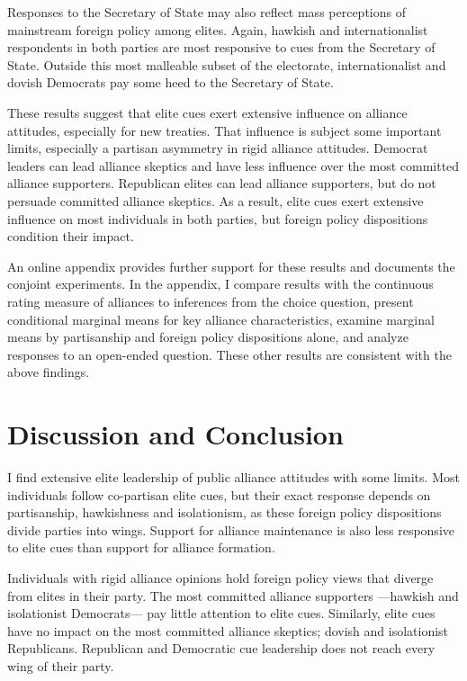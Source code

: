 \documentclass[12pt]{article}
\begin{document}
Responses to the Secretary of State may also reflect mass perceptions of mainstream foreign policy among elites.
Again, hawkish and internationalist respondents in both parties are most responsive to cues from the Secretary of State.
Outside this most malleable subset of the electorate, internationalist and dovish Democrats pay some heed to the Secretary of State.  


These results suggest that elite cues exert extensive influence on alliance attitudes, especially for new treaties.
That influence is subject some important limits, especially a partisan asymmetry in rigid alliance attitudes. 
Democrat leaders can lead alliance skeptics and have less influence over the most committed alliance supporters. 
Republican elites can lead alliance supporters, but do not persuade committed alliance skeptics. 
As a result, elite cues exert extensive influence on most individuals in both parties, but foreign policy dispositions condition their impact. 


An online appendix provides further support for these results and documents the conjoint experiments. 
In the appendix, I compare results with the continuous rating measure of alliances to inferences from the choice question, present conditional marginal means for key alliance characteristics, examine marginal means by partisanship and foreign policy dispositions alone, and analyze responses to an open-ended question. 
These other results are consistent with the above findings. 


\section{Discussion and Conclusion} 


I find extensive elite leadership of public alliance attitudes with some limits.  
Most individuals follow co-partisan elite cues, but their exact response depends on partisanship, hawkishness and isolationism, as these foreign policy dispositions divide parties into wings.
Support for alliance maintenance is also less responsive to elite cues than support for alliance formation. 


Individuals with rigid alliance opinions hold foreign policy views that diverge from elites in their party.  
The most committed alliance supporters ---hawkish and isolationist Democrats--- pay little attention to elite cues.
Similarly, elite cues have no impact on the most committed alliance skeptics; dovish and isolationist Republicans. 
Republican and Democratic cue leadership does not reach every wing of their party. 
\end{document}
